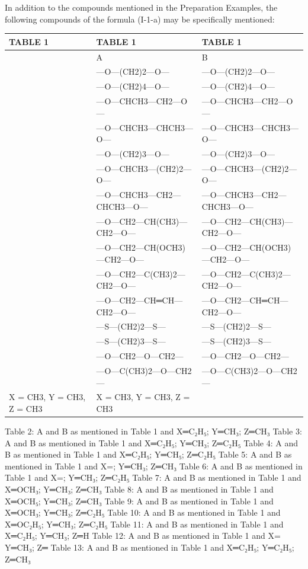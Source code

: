 \documentclass[11pt,a4paper]{article}
\begin{document}
In addition to the compounds mentioned in the Preparation Examples, the following compounds of the formula (I-1-a) may be specifically mentioned:

\begin{table}[h]
\begin{tabular}{|l|l|l|}
\hline
TABLE 1 & TABLE 1 & TABLE 1 \\ \hline
 & A & B \\ \hline
 & —O—(CH2)2—O— & —O—(CH2)2—O— \\ \hline
 & —O—(CH2)4—O— & —O—(CH2)4—O— \\ \hline
 & —O—CHCH3—CH2—O— & —O—CHCH3—CH2—O— \\ \hline
 & —O—CHCH3—CHCH3—O— & —O—CHCH3—CHCH3—O— \\ \hline
 & —O—(CH2)3—O— & —O—(CH2)3—O— \\ \hline
 & —O—CHCH3—(CH2)2—O— & —O—CHCH3—(CH2)2—O— \\ \hline
 & —O—CHCH3—CH2—CHCH3—O— & —O—CHCH3—CH2—CHCH3—O— \\ \hline
 & —O—CH2—CH(CH3)—CH2—O— & —O—CH2—CH(CH3)—CH2—O— \\ \hline
 & —O—CH2—CH(OCH3)—CH2—O— & —O—CH2—CH(OCH3)—CH2—O— \\ \hline
 & —O—CH2—C(CH3)2—CH2—O— & —O—CH2—C(CH3)2—CH2—O— \\ \hline
 & —O—CH2—CH═CH—CH2—O— & —O—CH2—CH═CH—CH2—O— \\ \hline
 & —S—(CH2)2—S— & —S—(CH2)2—S— \\ \hline
 & —S—(CH2)3—S— & —S—(CH2)3—S— \\ \hline
 & —O—CH2—O—CH2— & —O—CH2—O—CH2— \\ \hline
 & —O—C(CH3)2—O—CH2— & —O—C(CH3)2—O—CH2— \\ \hline
X = CH3, Y = CH3, Z = CH3 & X = CH3, Y = CH3, Z = CH3 &  \\ \hline
\end{tabular}
\end{table}

Table 2: A and B as mentioned in Table 1 and X═C₂H₅; Y═CH₃; Z═CH₃ Table 3: A and B as mentioned in Table 1 and X═C₂H₅; Y═CH₃; Z═C₂H₅ Table 4: A and B as mentioned in Table 1 and X═C₂H₅; Y═CH₅; Z═C₂H₅ Table 5: A and B as mentioned in Table 1 and X=; Y═CH₃; Z═CH₃ Table 6: A and B as mentioned in Table 1 and X=; Y═CH₃; Z═C₂H₅ Table 7: A and B as mentioned in Table 1 and X═OCH₃; Y═CH₃; Z═CH₃ Table 8: A and B as mentioned in Table 1 and X═OCH₅; Y═CH₃; Z═CH₃ Table 9: A and B as mentioned in Table 1 and X═OCH₃; Y═CH₃; Z═C₂H₅ Table 10: A and B as mentioned in Table 1 and X═OC₂H₅; Y═CH₃; Z═C₂H₅ Table 11: A and B as mentioned in Table 1 and X═C₂H₅; Y═CH₃; Z═H Table 12: A and B as mentioned in Table 1 and X= Y═CH₃; Z═ Table 13: A and B as mentioned in Table 1 and X═C₂H₅; Y═C₂H₅; Z═CH₃
\end{document}
